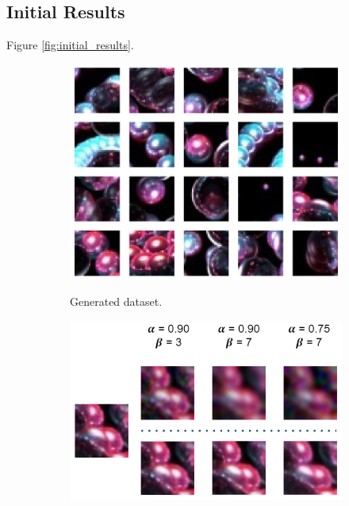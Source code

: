 \documentclass{article}
\begin{document}
\subsection{Initial Results}
\label{subsec:initial}

Figure \ref{fig:initial_results}.

\begin{figure}[h!]
\centering
\begin{subfigure}{0.375\textwidth}
\begin{center}
\begin{minipage}[t]{0.95\linewidth}
\begin{centering}
{\includegraphics[width=\linewidth]{srgan_frame_samples.png}}
\caption{Generated dataset.}
\label{fig:frame_dataset}
\end{centering}
\end{minipage}
\end{center}
\end{subfigure}
\begin{subfigure}{0.45\textwidth}
\begin{center}
\begin{minipage}[t]{0.95\linewidth}
\begin{centering}
{\includegraphics[width=\linewidth]{srgan_frame_outputs.png}}

\end{centering}
\end{minipage}
\end{center}
\end{subfigure}
\end{figure}
\end{document}
